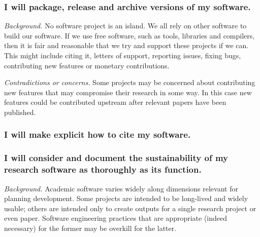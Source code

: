 \documentclass[a4paper,UKenglish]{dagman}
\renewcommand{\paragraph}[1]{\subsubsection*{#1}\xspace}
\begin{document}
\paragraph{I will package, release and archive versions of my software.}

\emph{Background.}
No software project is an island. We all rely on other software to build our software. If we use free software, such as tools, libraries and compilers, then it is fair and reasonable that we try and support these projects if we can. This might include citing it, letters of support, reporting issues, fixing bugs, contributing new features or monetary contributions.

\emph{Contradictions or concerns.}
Some projects may be concerned about contributing new features that may compromise their research in some way. In this case new features could be contributed upstream after relevant papers have been published.



\paragraph{I will make explicit how to cite my software.}


\paragraph{I will consider and document the sustainability of my research software as thoroughly as its function.}



\emph{Background.} Academic software varies widely along dimensions relevant for planning development. Some projects are intended to be long-lived and widely usable; others are intended only to create outputs for a single research project or even paper. Software engineering practices that are appropriate (indeed necessary) for the former may be overkill for the latter. 
\end{document}
